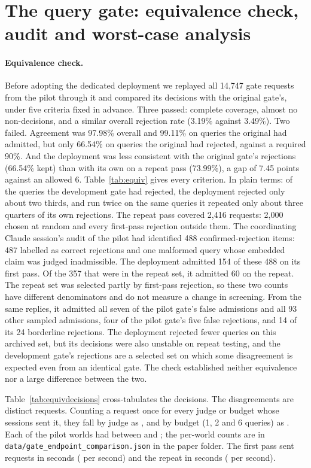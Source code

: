 \section{The query gate: equivalence check, audit and worst-case analysis}
\label{app:gate}

\paragraph{Equivalence check.} Before adopting the dedicated deployment we replayed all 14,747 gate requests from
the pilot through it and compared its decisions with the original gate's, under five criteria fixed in advance. Three
passed: complete coverage, almost no non-decisions, and a similar overall rejection rate (3.19\% against 3.49\%). Two
failed. Agreement was 97.98\% overall and 99.11\% on queries the original had admitted, but only 66.54\% on queries
the original had rejected, against a required 90\%. And the deployment was less consistent with the original gate's
rejections (66.54\% kept) than with its own on a repeat pass (73.99\%), a gap of 7.45 points against an allowed 6.
Table~\ref{tab:equiv} gives every criterion. In plain terms: of the queries the development gate had rejected, the
deployment rejected only about two thirds, and run twice on the same queries it repeated only about three quarters
of its own rejections. The repeat pass covered 2,416 requests: 2,000 chosen at random and every first-pass rejection
outside them. The coordinating Claude session's audit of the pilot had identified 488 confirmed-rejection items: 487
labelled as correct rejections and one malformed query whose embedded claim was judged inadmissible. The deployment
admitted 154 of these 488 on its first pass. Of the 357 that were in the repeat set, it admitted 60 on the repeat.
The repeat set was selected partly by first-pass rejection, so these two counts have different denominators and do
not measure a change in screening. From the same
replies, it admitted all seven of the pilot gate's false admissions and all 93 other sampled admissions, four of the
pilot gate's five false rejections, and 14 of its 24 borderline rejections. The deployment rejected fewer queries on
this archived set, but its decisions were also unstable on repeat testing, and the development gate's rejections are
a selected set on which some disagreement is expected even from an identical gate. The check established neither
equivalence nor a large difference between the two.

Table~\ref{tab:equivdecisions} cross-tabulates the decisions. The \equivDisagreements{} disagreements are distinct
requests. Counting a request once for every judge or budget whose sessions sent it, they fall by judge as
\equivByJudge, and by budget (1, 2 and 6 queries) as \equivByBudget. Each of the \equivWorlds{} pilot worlds had
between \equivByWorldLo{} and \equivByWorldHi; the per-world counts are in
\texttt{data/gate\_endpoint\_comparison.json} in the paper folder. The first pass sent \equivFirstSent{} requests in
\equivFirstSeconds{} seconds (\equivFirstRate{} per second) and the repeat \equivRepeatSent{} in
\equivRepeatSeconds{} seconds (\equivRepeatRate{} per second).

